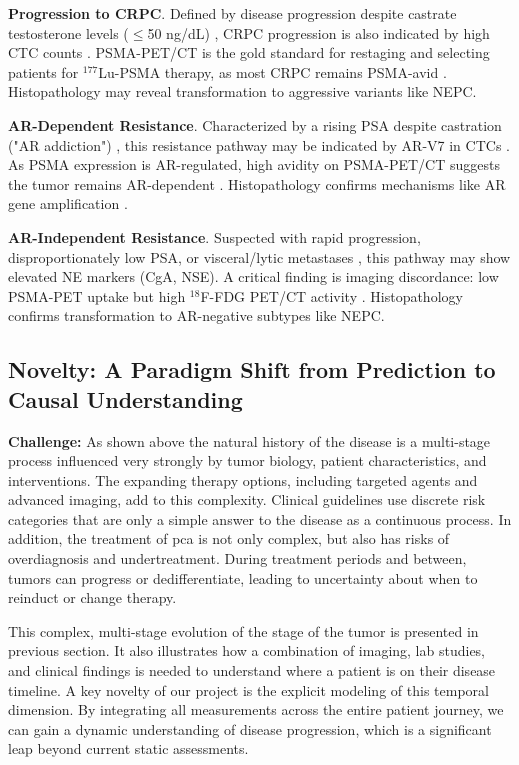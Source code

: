 \documentclass[11pt, a4paper]{article}
\begin{document}
\textbf{Progression to CRPC}. Defined by disease progression despite castrate testosterone levels ($\leq$50 ng/dL) \cite{CalderoniMaietti2023}, CRPC progression is also indicated by high CTC counts \cite{Ronningas_2022}. PSMA-PET/CT is the gold standard for restaging and selecting patients for ${}^{177}$Lu-PSMA therapy, as most CRPC remains PSMA-avid \cite{CalderoniMaietti2023,VetroneMei2023}. Histopathology may reveal transformation to aggressive variants like NEPC.

\textbf{AR-Dependent Resistance}. Characterized by a rising PSA despite castration ("AR addiction") \cite{LeePark2020}, this resistance pathway may be indicated by AR-V7 in CTCs \cite{ChenWang2023}. As PSMA expression is AR-regulated, high avidity on PSMA-PET/CT suggests the tumor remains AR-dependent \cite{MohseniniaZamaniSiahkali2024}. Histopathology confirms mechanisms like AR gene amplification \cite{MartinCaraballo2024}.

\textbf{AR-Independent Resistance}. Suspected with rapid progression, disproportionately low PSA, or visceral/lytic metastases \cite{OKAHATANO2024}, this pathway may show elevated NE markers (CgA, NSE). A critical finding is imaging discordance: low PSMA-PET uptake but high ${}^{18}$F-FDG PET/CT activity \cite{AmalachandranSivathapandi2024,MohseniniaZamaniSiahkali2024}. Histopathology confirms transformation to AR-negative subtypes like NEPC.





\subsection{Novelty: A Paradigm Shift from Prediction to Causal Understanding}
\textbf{Challenge:} 
As shown above the natural history of the disease is a multi-stage process influenced very strongly by tumor biology, patient characteristics, and interventions. The expanding therapy options, including targeted agents and advanced imaging, add to this complexity. Clinical guidelines use discrete risk categories that are only a simple answer to the disease as a continuous process. In addition, the treatment of \gls{pca} is not only complex, but also has risks of overdiagnosis and undertreatment. During treatment periods and between, tumors can progress or dedifferentiate, leading to uncertainty about when to reinduct or change therapy. 

This complex, multi-stage evolution of the stage of the tumor is presented in previous section. It also illustrates how a combination of imaging, lab studies, and clinical findings is needed to understand where a patient is on their disease timeline. A key novelty of our project is the explicit modeling of this temporal dimension. By integrating all measurements across the entire patient journey, we can gain a dynamic understanding of disease progression, which is a significant leap beyond current static assessments.
\end{document}
